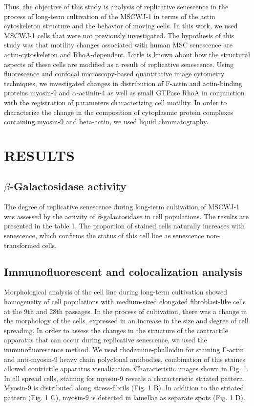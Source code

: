 \documentclass[alpha-refs]{wiley-article}
\begin{document}
Thus, the objective of this study is analysis of replicative senescence in the process of long-term cultivation of the MSCWJ-1 in terms of the actin cytoskeleton structure and the behavior of moving cells.
In this work, we used MSCWJ-1 cells that were not previously investigated.
The hypothesis of this study was that motility changes associated with human MSC senescence are actin-cytoskeleton and RhoA-dependent.
Little is known about how the structural aspects of these cells are modified as a result of replicative senescence.
Using fluorescence and confocal microscopy-based quantitative image cytometry techniques, we investigated changes in distribution of F-actin and actin-binding proteins myosin-9 and $\alpha$-actinin-4 as well as small GTPase RhoA in conjunction with the registration of parameters characterizing cell motility.
In order to characterize the change in the composition of cytoplasmic protein complexes containing myosin-9 and beta-actin, we used liquid chromatography.


\section{RESULTS}

\subsection{$\beta$-Galactosidase activity}


The degree of replicative senescence during long-term cultivation of MSCWJ-1 was assessed by the activity of $\beta$-galactosidase in cell populations.
The results are presented in the table 1.
The proportion of stained cells naturally increases with senescence, which confirms the status of this cell line as senescence non-transformed cells.


\subsection{Immunofluorescent and colocalization analysis}

Morphological analysis of the cell line during long-term cultivation showed homogeneity of cell populations with medium-sized elongated fibroblast-like cells at the 9th and 28th passages.
In the process of cultivation, there was a change in the morphology of the cells, expressed in an increase in the size and degree of cell spreading.
In order to assess the changes in the structure of the contractile apparatus that can occur during replicative senescence, we used the immunofluorescence method.
We used rhodamine-phalloidin for staining F-actin and anti-myosin-9 heavy chain polyclonal antibodies, combination of this staines allowed contrictile apparatus visualization.
Characteristic images shown in Fig. 1.
In all spread cells, staining for myosin-9 reveals a characteristic striated pattern.
Myosin-9 is distributed along stress-fibrils (Fig. 1 B).
In addition to the striated pattern (Fig. 1 C), myosin-9 is detected in lamellae as separate spots (Fig. 1 D).
\end{document}
